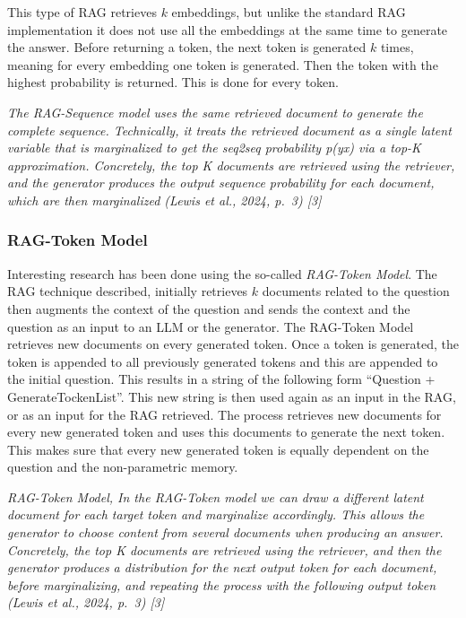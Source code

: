 \documentclass[11pt]{wseas}
\begin{document}
This type of RAG retrieves \(k\) embeddings, but unlike the standard RAG
implementation it does not use all the embeddings at the same time to
generate the answer. Before returning a token, the next token is
generated \(k\) times, meaning for every embedding one token is
generated. Then the token with the highest probability is returned. This
is done for every token.

\emph{The RAG-Sequence model uses the same retrieved document to
generate the complete sequence. Technically, it treats the retrieved
document as a single latent variable that is marginalized to get the
seq2seq probability p(y\textbar x) via a top-K approximation.
Concretely, the top K documents are retrieved using the retriever, and
the generator produces the output sequence probability for each
document, which are then marginalized (Lewis et al., 2024, p.~3)
{[}3{]}}

\subsubsection{RAG-Token Model}\label{rag-token-model}

Interesting research has been done using the so-called \emph{RAG-Token
Model}. The RAG technique described, initially retrieves \(k\) documents
related to the question then augments the context of the question and
sends the context and the question as an input to an LLM or the
generator. The RAG-Token Model retrieves new documents on every
generated token. Once a token is generated, the token is appended to all
previously generated tokens and this are appended to the initial
question. This results in a string of the following form ``Question +
GenerateTockenList''. This new string is then used again as an input in
the RAG, or as an input for the RAG retrieved. The process retrieves new
documents for every new generated token and uses this documents to
generate the next token. This makes sure that every new generated token
is equally dependent on the question and the non-parametric memory.

\emph{RAG-Token Model, In the RAG-Token model we can draw a different
latent document for each target token and marginalize accordingly. This
allows the generator to choose content from several documents when
producing an answer. Concretely, the top K documents are retrieved using
the retriever, and then the generator produces a distribution for the
next output token for each document, before marginalizing, and repeating
the process with the following output token (Lewis et al., 2024, p.~3)
{[}3{]}}
\end{document}
